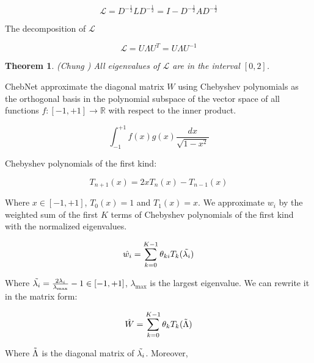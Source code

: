 \documentclass{article}
\newtheorem{theorem}{Theorem}
\begin{document}
    \begin{equation}
        \mathcal{L} = D^{-\frac{1}{2}} L D^{-\frac{1}{2}} = I - D^{-\frac{1}{2}} A D^{-\frac{1}{2}}
    \end{equation}

    The decomposition of $\mathcal{L}$

    \begin{equation}
        \mathcal{L} = U \Lambda U^T = U \Lambda U^{-1}
    \end{equation}

    \begin{theorem}(Chung \cite{chung1997spectral})
        All eigenvalues of $\mathcal{L}$ are in the interval $[0, 2]$.
    \end{theorem}

    ChebNet \cite{tang2019chebnet} approximate the diagonal matrix $W$ using Chebyshev polynomials as the orthogonal basis in the polynomial subspace of the vector space of all functions $f: [-1, +1] \to \mathbb{R}$ with respect to the inner product.

    \begin{equation}
        \int_{-1}^{+1} f(x) g(x) \frac{dx}{\sqrt{1-x^2}}
    \end{equation}

    Chebyshev polynomials of the first kind:

    \begin{equation}
        T_{n+1}(x) = 2x T_n(x) - T_{n-1}(x)
    \end{equation}

    Where $x \in [-1, +1]$, $T_0(x) = 1$ and $T_1(x) = x$. We approximate $w_i$ by the weighted sum of the first $K$ terms of Chebyshev polynomials of the first kind with the normalized eigenvalues.

    \begin{equation}
        \hat{w_i} = \sum_{k=0}^{K-1} \theta_{k i} T_k(\Tilde{\lambda_i})
    \end{equation}

    Where $\Tilde{\lambda_i} = \frac{2 \lambda_i}{\lambda_{\max}} - 1 \in [-1, +1]$, $\lambda_{\max}$ is the largest eigenvalue. We can rewrite it in the matrix form:

    \begin{equation}
        \hat{W} = \sum_{k=0}^{K-1} \theta_k T_k(\Tilde{\Lambda})
    \end{equation}

    Where $\Tilde{\Lambda}$ is the diagonal matrix of $\Tilde{\lambda_i}$. Moreover,
\end{document}
